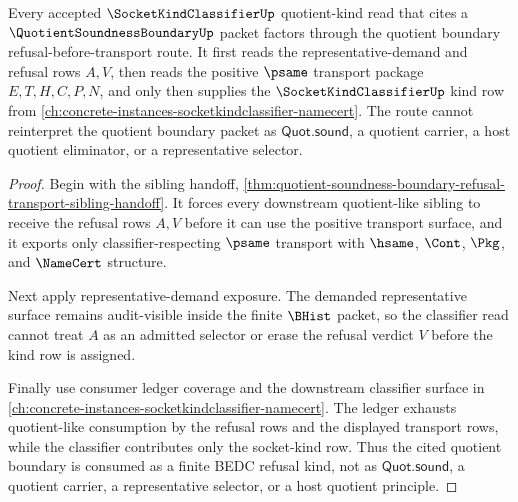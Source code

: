 \begin{theorem}
\label{thm:quotient-soundness-boundary-socket-kind-route}
Every accepted $\SocketKindClassifierUp$ quotient-kind read that cites a
$\QuotientSoundnessBoundaryUp$ packet factors through the quotient boundary
refusal-before-transport route. It first reads the representative-demand and
refusal rows $A,V$, then reads the positive $\psame$ transport package
$E,T,H,C,P,N$, and only then supplies the $\SocketKindClassifierUp$ kind row
from \autoref{ch:concrete-instances-socketkindclassifier-namecert}. The route
cannot reinterpret the quotient boundary packet as $\mathsf{Quot.sound}$, a
quotient carrier, a host quotient eliminator, or a representative selector.
\end{theorem}
\begin{proof}
Begin with the sibling handoff,
\autoref{thm:quotient-soundness-boundary-refusal-transport-sibling-handoff}.
It forces every downstream quotient-like sibling to receive the refusal rows
$A,V$ before it can use the positive transport surface, and it exports only
classifier-respecting $\psame$ transport with $\hsame$, $\Cont$, $\Pkg$, and
$\NameCert$ structure.

Next apply representative-demand exposure. The demanded representative surface
remains audit-visible inside the finite $\BHist$ packet, so the classifier read
cannot treat $A$ as an admitted selector or erase the refusal verdict $V$ before
the kind row is assigned.

Finally use consumer ledger coverage and the downstream classifier surface in
\autoref{ch:concrete-instances-socketkindclassifier-namecert}. The ledger
exhausts quotient-like consumption by the refusal rows and the displayed
transport rows, while the classifier contributes only the socket-kind row.
Thus the cited quotient boundary is consumed as a finite BEDC refusal kind, not
as $\mathsf{Quot.sound}$, a quotient carrier, a representative selector, or a
host quotient principle.
\end{proof}

